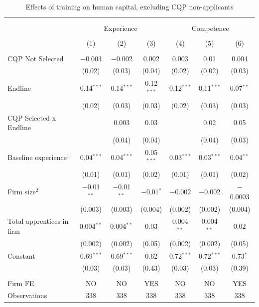 \documentclass[
  11pt,
a4paper
]{article}
\begin{document}
\begin{table}[H] \centering 
  \caption{Effects of training on human capital, excluding CQP non-applicants} 
  \label{tab:tbl-appreg2} 
\small 
\begin{tabular}{@{\extracolsep{-8pt}}lcccccc} 
\\[-1.8ex]\hline 
\hline \\[-1.8ex] 
\\[-1.8ex] & \multicolumn{3}{c}{Experience} & \multicolumn{3}{c}{Competence} \\ 
\\[-1.8ex] & (1) & (2) & (3) & (4) & (5) & (6)\\ 
\hline \\[-1.8ex] 
 CQP Not Selected & $-$0.003 & $-$0.002 & 0.002 & 0.003 & 0.01 & 0.004 \\ 
  & (0.02) & (0.03) & (0.04) & (0.02) & (0.02) & (0.03) \\ 
  Endline & 0.14$^{***}$ & 0.14$^{***}$ & 0.12$^{***}$ & 0.12$^{***}$ & 0.11$^{***}$ & 0.07$^{**}$ \\ 
  & (0.02) & (0.03) & (0.03) & (0.02) & (0.03) & (0.03) \\ 
  CQP Selected x Endline &  & 0.003 & 0.03 &  & 0.02 & 0.05 \\ 
  &  & (0.04) & (0.04) &  & (0.04) & (0.03) \\ 
  Baseline experience$^1$ & 0.04$^{***}$ & 0.04$^{***}$ & 0.05$^{***}$ & 0.03$^{***}$ & 0.03$^{***}$ & 0.04$^{**}$ \\ 
  & (0.01) & (0.01) & (0.02) & (0.01) & (0.01) & (0.02) \\ 
  Firm size$^2$ & $-$0.01$^{**}$ & $-$0.01$^{**}$ & $-$0.01$^{*}$ & $-$0.002 & $-$0.002 & $-$0.0003 \\ 
  & (0.003) & (0.003) & (0.004) & (0.002) & (0.002) & (0.004) \\ 
  Total apprentices in firm & 0.004$^{**}$ & 0.004$^{**}$ & 0.03 & 0.004$^{**}$ & 0.004$^{**}$ & 0.02 \\ 
  & (0.002) & (0.002) & (0.05) & (0.002) & (0.002) & (0.05) \\ 
  Constant & 0.69$^{***}$ & 0.69$^{***}$ & 0.62 & 0.72$^{***}$ & 0.72$^{***}$ & 0.73$^{*}$ \\ 
  & (0.03) & (0.03) & (0.43) & (0.03) & (0.03) & (0.39) \\ 
 \hline \\[-1.8ex] 
Firm FE & NO & NO & YES & NO & NO & YES \\ 
Observations & 338 & 338 & 338 & 338 & 338 & 338 \\ 

\end{tabular}
\end{table}
\end{document}
